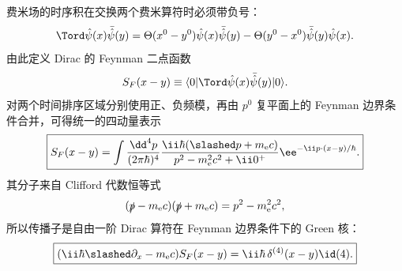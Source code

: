 费米场的时序积在交换两个费米算符时必须带负号：
\begin{equation}
 \Tord\hat\psi(x)\bar{\hat\psi}(y)
 =\Theta(x^0-y^0)\hat\psi(x)\bar{\hat\psi}(y)
 -\Theta(y^0-x^0)\bar{\hat\psi}(y)\hat\psi(x).
 \label{eq:fermion-time-order-r2}
\end{equation}
由此定义 Dirac 的 Feynman 二点函数
\begin{equation*}
 S_F(x-y)
 \equiv\langle0|\Tord\hat\psi(x)\bar{\hat\psi}(y)|0\rangle.
\end{equation*}
对两个时间排序区域分别使用正、负频模，再由 $p^0$ 复平面上的 Feynman 边界条件合并，可得统一的四动量表示
\begin{equation}
 \boxed{
 S_F(x-y)
 =\int\frac{\dd^4 p}{(2\pi\hbar)^4}
 \frac{\ii\hbar(\slashed p+m_{\mathrm e} c)}{p^2-m_{\mathrm e}^2c^2+\ii0^+}
 \ee^{-\ii p\cdot(x-y)/\hbar}.}
 \label{eq:dirac-prop-struct-r2}
\end{equation}
其分子来自 Clifford 代数恒等式
\begin{equation*}
 (\slashed p-m_{\mathrm e} c)(\slashed p+m_{\mathrm e} c)=p^2-m_{\mathrm e}^2c^2,
\end{equation*}
所以传播子是自由一阶 Dirac 算符在 Feynman 边界条件下的 Green 核：
\begin{equation}
 \boxed{
 (\ii\hbar\slashed\partial_x-m_{\mathrm e} c)S_F(x-y)
 =\ii\hbar\,\delta^{(4)}(x-y)\id(4).}
 \label{eq:dirac-green-exact-r2}
\end{equation}

